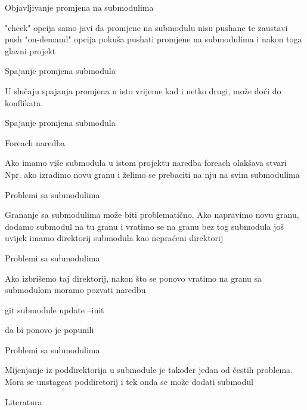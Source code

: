 \documentclass[10pt]{beamer}
\begin{document}
\begin{frame}[fragile]{Objavljivanje promjena na submodulima}
    
    "check" opcija samo javi da promjene na submodulu nisu pushane te zaustavi push
    "on-demand" opcija pokuša pushati promjene na submodulima i nakon toga glavni projekt
    
\end{frame}

\begin{frame}[fragile]{Spajanje promjena submodula}
    
    U slučaju spajanja promjena u isto vrijeme kad i netko drugi, može doći do konflikata.
    
    
\end{frame}

\begin{frame}[fragile]{Spajanje promjena submodula}
    
    
    
\end{frame}

\begin{frame}[fragile]{Foreach naredba}
    
    Ako imamo više submodula u istom projektu naredba foreach olakšava stvari
	Npr. ako izradimo novu granu i želimo se prebaciti na nju na svim submodulima
	
    
\end{frame}

\begin{frame}[fragile]{Problemi sa submodulima}
    
    Grananje sa submodulima može biti problematično.
    Ako napravimo novu granu, dodamo submodul na tu granu i vratimo se na granu bez tog submodula još uvijek imamo direktorij submodula kao nepraćeni direktorij
    
\end{frame}

\begin{frame}[fragile]{Problemi sa submodulima}
    
    Ako izbrišemo taj direktorij, nakon što se ponovo vratimo na granu sa submodulom moramo pozvati naredbu
    \begin{semiverbatim}git submodule update --init\end{semiverbatim}
    da bi ponovo je popunili
    
\end{frame}

\begin{frame}[fragile]{Problemi sa submodulima}
    
    Mijenjanje iz poddirektorija u submodule je također jedan od čestih problema.
    Mora se unstageat poddiretorij i tek onda se može dodati submodul
    
\end{frame}

\begin{frame}[fragile]{Literatura}
	
  	
\end{frame}
\end{document}
